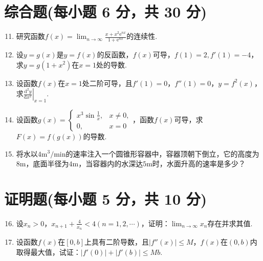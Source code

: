 \documentclass[../main.tex]{subfiles}
\begin{document}
\section{综合题(每小题 6 分，共 30 分)}
\begin{enumerate}
    \setcounter{enumi}{10}
    \item 研究函数$f(x)=\lim_{n\to\infty}\frac{x+x^{2}\mathrm{e}^{nx}}{1+\mathrm{e}^{nx}}$的连续性.
          \vspace{10em}

    \item 设$y=g(x)$是$y=f(x)$的反函数，$f(x)$可导，$f(1)=2,f'(1)=-4$，求$y=
              g(1+x^{2})$在$x=1$处的导数.
          \vspace{10em}

    \item 设函数$f(x)$在$x=1$处二阶可导，且$f'(1)=0$，$f''(1)=0$，$y=f^{2}(x
              )$，求$\left.\frac{\mathrm{d}^{2} y}{\mathrm{d}x^{2}}\right|_{x=1}$.
          \vspace{8em}

    \item 设函数$g(x)=
              \begin{cases}
                  x^{3}\sin\frac{1}{x}, & x\neq0, \\
                  0,                    & x=0
              \end{cases}$，函数$f(x)$可导，求$F(x)=f(g(x))$的导数.
          \vspace{10em}

    \item 将水以$4\mathrm{m}^{3}/\mathrm{min}$的速率注入一个圆锥形容器中，容器顶朝下倒立，它的高度为$8
              \mathrm{m}$，底面半径为$4\mathrm{m}$，当容器内的水深达$5\mathrm{m}$时，水面升高的速率是多少？
          \vspace{12em}
\end{enumerate}

\section{证明题(每小题 5 分，共 10 分)}
\begin{enumerate}
    \setcounter{enumi}{15}
    \item 设$x_{n}>0$，$x_{n+1}+\frac{4}{x_{n}}<4(n=1,2,\cdots)$，证明：$\lim
              _{n\to\infty}x_{n}$存在并求其值.
          \vspace{12em}

    \item 设函数$f(x)$在$[0,b]$上具有二阶导数，且$|f''(x)|\leq M$，$f(x)$在$(
              0,b)$内取得最大值，试证：$|f'(0)|+|f'(b)|\leq Mb$.
          \vspace{10em}
\end{enumerate}
\end{document}
